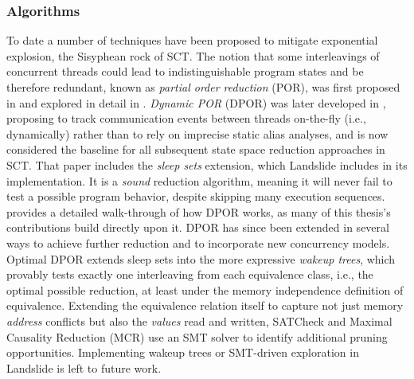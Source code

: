 \subsubsection{Algorithms}
\label{sec:related-algs}

To date a number of techniques have been proposed to mitigate exponential explosion,
the Sisyphean rock of SCT.
The notion that some interleavings of concurrent threads could lead to indistinguishable program states and be therefore redundant,
known as {\em partial order reduction} (POR),
was first proposed in \cite{partial-model-checking}
and explored in detail in \cite{partial-order-methods}.
{\em Dynamic POR} (DPOR) was later developed in \cite{dpor},
proposing to track communication events between threads on-the-fly (i.e., dynamically)
rather than to rely on imprecise static alias analyses,
and is now considered the baseline for all subsequent state space reduction approaches in SCT.
That paper includes the {\em sleep sets} extension,
which Landslide includes in its implementation.
It is a {\em sound} reduction algorithm, meaning it will never fail to test a possible program behavior, despite skipping many execution sequences.
\sect{\ref{sec:landslide-dpor}} provides a detailed walk-through of how DPOR works,
as many of this thesis's contributions build directly upon it.
%
DPOR has since been extended in several ways to achieve further reduction
and to incorporate new concurrency models.
Optimal DPOR \cite{optimal-dpor} extends sleep sets into the more expressive {\em wakeup trees},
which provably tests exactly one interleaving from each equivalence class,
i.e., the optimal possible reduction,
at least under the memory independence definition of equivalence.
Extending the equivalence relation itself to capture not just memory {\em address} conflicts
but also the {\em values} read and written,
SATCheck \cite{satcheck} and Maximal Causality Reduction (MCR) \cite{mcr}
use an SMT solver \cite{z3} to identify additional pruning opportunities.
Implementing wakeup trees or SMT-driven exploration in Landslide is left to future work.

